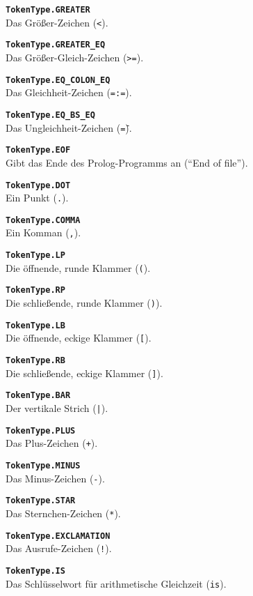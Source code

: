 \documentclass[parskip=full,11pt,twoside]{scrartcl}
\begin{document}
\textbf{\texttt{TokenType.GREATER}}\\
Das Größer-Zeichen (\texttt{<}).

\textbf{\texttt{TokenType.GREATER\_EQ}}\\
Das Größer-Gleich-Zeichen (\texttt{>=}).

\textbf{\texttt{TokenType.EQ\_COLON\_EQ}}\\
Das Gleichheit-Zeichen (\texttt{=:=}).

\textbf{\texttt{TokenType.EQ\_BS\_EQ}}\\
Das Ungleichheit-Zeichen (\texttt{=\=}).

\textbf{\texttt{TokenType.EOF}}\\
Gibt das Ende des Prolog-Programms an (\enquote{End of file}).

\textbf{\texttt{TokenType.DOT}}\\
Ein Punkt (\texttt{.}).

\textbf{\texttt{TokenType.COMMA}}\\
Ein Komman (\texttt{,}).

\textbf{\texttt{TokenType.LP}}\\
Die öffnende, runde Klammer (\texttt{(}).

\textbf{\texttt{TokenType.RP}}\\
Die schließende, runde Klammer (\texttt{)}).

\textbf{\texttt{TokenType.LB}}\\
Die öffnende, eckige Klammer (\texttt{[}).

\textbf{\texttt{TokenType.RB}}\\
Die schließende, eckige Klammer (\texttt{]}).

\textbf{\texttt{TokenType.BAR}}\\
Der vertikale Strich (\texttt{|}).

\textbf{\texttt{TokenType.PLUS}}\\
Das Plus-Zeichen (\texttt{+}).

\textbf{\texttt{TokenType.MINUS}}\\
Das Minus-Zeichen (\texttt{-}).

\textbf{\texttt{TokenType.STAR}}\\
Das Sternchen-Zeichen (\texttt{*}).

\textbf{\texttt{TokenType.EXCLAMATION}}\\
Das Ausrufe-Zeichen (\texttt{!}).

\textbf{\texttt{TokenType.IS}}\\
Das Schlüsselwort für arithmetische Gleichzeit (\texttt{is}).
\end{document}

